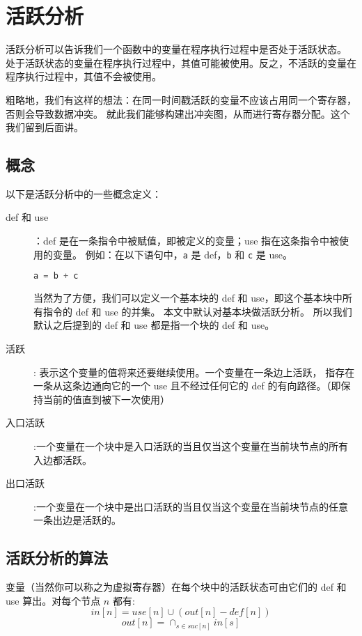 \section{活跃分析}

活跃分析可以告诉我们一个函数中的变量在程序执行过程中是否处于活跃状态。
处于活跃状态的变量在程序执行过程中，其值可能被使用。反之，不活跃的变量在程序执行过程中，其值不会被使用。

粗略地，我们有这样的想法：在同一时间戳活跃的变量不应该占用同一个寄存器，否则会导致数据冲突。
就此我们能够构建出冲突图，从而进行寄存器分配。这个我们留到后面讲。

\subsection{概念}

以下是活跃分析中的一些概念定义：

\begin{description}
    \item[def 和 use]：def 是在一条指令中被赋值，即被定义的变量；use 指在这条指令中被使用的变量。
例如：在以下语句中，\texttt{a} 是 def，\texttt{b} 和 \texttt{c} 是 use。
\begin{lstlisting}[language=c]
    a = b + c
\end{lstlisting}

当然为了方便，我们可以定义一个基本块的 def 和 use，即这个基本块中所有指令的 def 和 use 的并集。
本文中默认对基本块做活跃分析。
所以我们默认之后提到的 def 和 use 都是指一个块的 def 和 use。

\item[活跃]: 表示这个变量的值将来还要继续使用。一个变量在一条边上活跃，
指存在一条从这条边通向它的一个 use 且不经过任何它的 def 的有向路径。（即保持当前的值直到被下一次使用）

\item[入口活跃]:一个变量在一个块中是入口活跃的当且仅当这个变量在当前块节点的所有入边都活跃。

\item[出口活跃]:一个变量在一个块中是出口活跃的当且仅当这个变量在当前块节点的任意一条出边是活跃的。

\end{description}

\subsection{活跃分析的算法}

变量（当然你可以称之为虚拟寄存器）在每个块中的活跃状态可由它们的 def 和 use 算出。对每个节点 $n$ 都有:
$$
in[n] = use[n] \cup (out[n] - def[n])
$$
$$
out[n] = \cap_{s \in suc[n]} in[s]
$$

